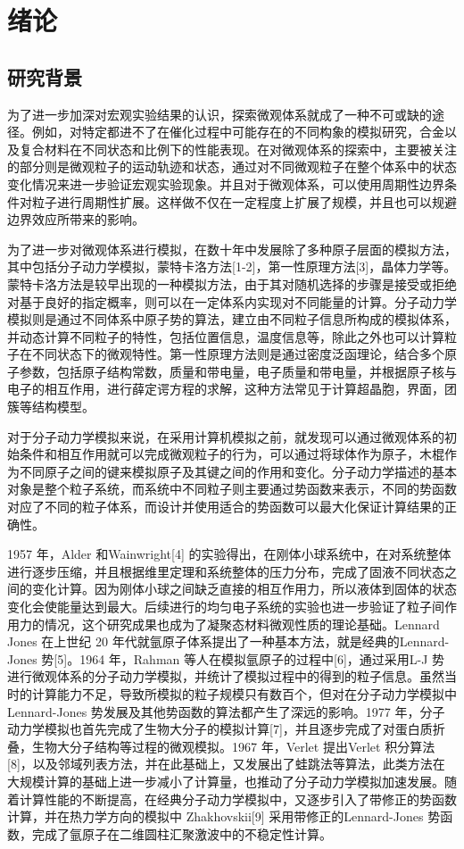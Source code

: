 
\chapter{绪论}

\section{研究背景}
为了进一步加深对宏观实验结果的认识，探索微观体系就成了一种不可或缺的途径。例如，对特定都进不了在催化过程中可能存在的不同构象的模拟研究，合金以及复合材料在不同状态和比例下的性能表现。在对微观体系的探索中，主要被关注的部分则是微观粒子的运动轨迹和状态，通过对不同微观粒子在整个体系中的状态变化情况来进一步验证宏观实验现象。并且对于微观体系，可以使用周期性边界条件对粒子进行周期性扩展。这样做不仅在一定程度上扩展了规模，并且也可以规避边界效应所带来的影响。

为了进一步对微观体系进行模拟，在数十年中发展除了多种原子层面的模拟方法，其中包括分子动力学模拟，蒙特卡洛方法[1-2]，第一性原理方法[3]，晶体力学等。蒙特卡洛方法是较早出现的一种模拟方法，由于其对随机选择的步骤是接受或拒绝对基于良好的指定概率，则可以在一定体系内实现对不同能量的计算。分子动力学模拟则是通过不同体系中原子势的算法，建立由不同粒子信息所构成的模拟体系，并动态计算不同粒子的特性，包括位置信息，温度信息等，除此之外也可以计算粒子在不同状态下的微观特性。第一性原理方法则是通过密度泛函理论，结合多个原子参数，包括原子结构常数，质量和带电量，电子质量和带电量，并根据原子核与电子的相互作用，进行薛定谔方程的求解，这种方法常见于计算超晶胞，界面，团簇等结构模型。

对于分子动力学模拟来说，在采用计算机模拟之前，就发现可以通过微观体系的初始条件和相互作用就可以完成微观粒子的行为，可以通过将球体作为原子，木棍作为不同原子之间的键来模拟原子及其键之间的作用和变化。分子动力学描述的基本对象是整个粒子系统，而系统中不同粒子则主要通过势函数来表示，不同的势函数对应了不同的粒子体系，而设计并使用适合的势函数可以最大化保证计算结果的正确性。

1957 年，Alder 和Wainwright[4] 的实验得出，在刚体小球系统中，在对系统整体进行逐步压缩，并且根据维里定理和系统整体的压力分布，完成了固液不同状态之间的变化计算。因为刚体小球之间缺乏直接的相互作用力，所以液体到固体的状态变化会使能量达到最大。后续进行的均匀电子系统的实验也进一步验证了粒子间作用力的情况，这个研究成果也成为了凝聚态材料微观性质的理论基础。Lennard Jones 在上世纪 20 年代就氩原子体系提出了一种基本方法，就是经典的Lennard-Jones 势[5]。1964 年，Rahman 等人在模拟氩原子的过程中[6]，通过采用L-J 势进行微观体系的分子动力学模拟，并统计了模拟过程中的得到的粒子信息。虽然当时的计算能力不足，导致所模拟的粒子规模只有数百个，但对在分子动力学模拟中 Lennard-Jones 势发展及其他势函数的算法都产生了深远的影响。1977 年，分子动力学模拟也首先完成了生物大分子的模拟计算[7]，并且逐步完成了对蛋白质折叠，生物大分子结构等过程的微观模拟。1967 年，Verlet 提出Verlet 积分算法[8]，以及邻域列表方法，并在此基础上，又发展出了蛙跳法等算法，此类方法在大规模计算的基础上进一步减小了计算量，也推动了分子动力学模拟加速发展。随着计算性能的不断提高，在经典分子动力学模拟中，又逐步引入了带修正的势函数计算，并在热力学方向的模拟中 Zhakhovskii[9] 采用带修正的Lennard-Jones 势函数，完成了氩原子在二维圆柱汇聚激波中的不稳定性计算。

